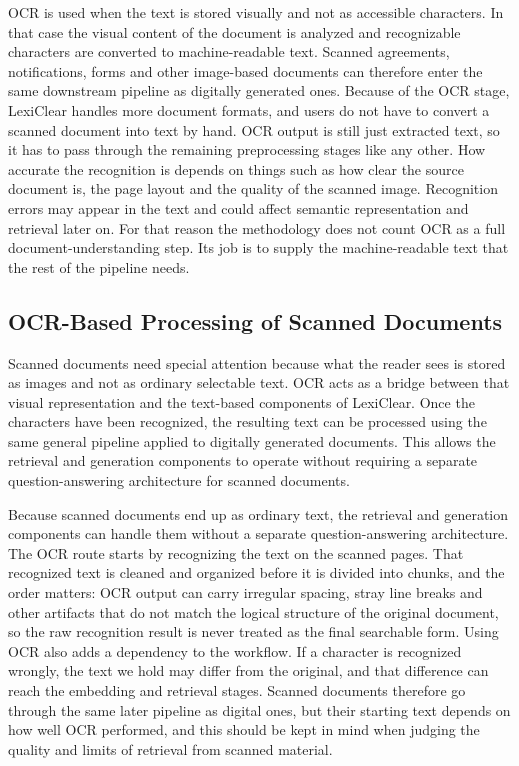 \documentclass[12pt,a4paper,oneside]{report}
\begin{document}
OCR is used when the text is stored visually and not as accessible characters. In that case the visual content of the document is analyzed and recognizable characters are converted to machine-readable text. Scanned agreements, notifications, forms and other image-based documents can therefore enter the same downstream pipeline as digitally generated ones. Because of the OCR stage, LexiClear handles more document formats, and users do not have to convert a scanned document into text by hand. OCR output is still just extracted text, so it has to pass through the remaining preprocessing stages like any other. How accurate the recognition is depends on things such as how clear the source document is, the page layout and the quality of the scanned image. Recognition errors may appear in the text and could affect semantic representation and retrieval later on. For that reason the methodology does not count OCR as a full document-understanding step. Its job is to supply the machine-readable text that the rest of the pipeline needs.

\subsection{OCR-Based Processing of Scanned Documents}

Scanned documents need special attention because what the reader sees is stored as images and not as ordinary selectable text. OCR acts as a bridge between that visual representation and the text-based components of LexiClear. Once the
characters have been recognized, the resulting text can be processed using
the same general pipeline applied to digitally generated documents. This
allows the retrieval and generation components to operate without requiring
a separate question-answering architecture for scanned documents.

Because scanned documents end up as ordinary text, the retrieval and generation components can handle them without a separate question-answering architecture. The OCR route starts by recognizing the text on the scanned pages. That recognized text is cleaned and organized before it is divided into chunks, and the order matters: OCR output can carry irregular spacing, stray line breaks and other artifacts that do not match the logical structure of the original document, so the raw recognition result is never treated as the final searchable form. Using OCR also adds a dependency to the workflow. If a character is recognized wrongly, the text we hold may differ from the original, and that difference can reach the embedding and retrieval stages. Scanned documents therefore go through the same later pipeline as digital ones, but their starting text depends on how well OCR performed, and this should be kept in mind when judging the quality and limits of retrieval from scanned material.
\end{document}

